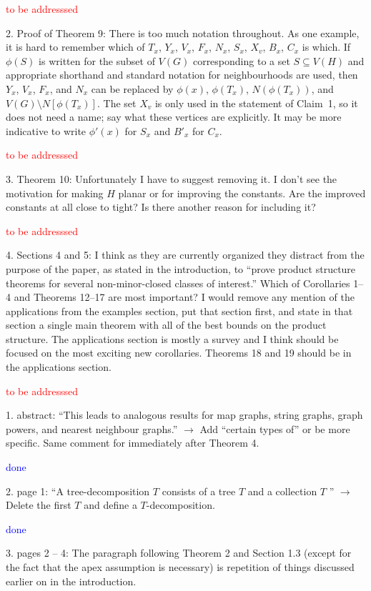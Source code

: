 \documentclass[12pt]{article}
\newcommand{\done}{\textcolor{blue}{done}}
\newcommand{\tba}{\textcolor{red}{to be addresssed}}
\begin{document}
\tba

2. Proof of Theorem 9: There is too much notation throughout. As
one example, it is hard to remember which of $T_x$, $Y_x$, $V_x$, $F_x$, $N_x$,
$S_x$, $X_v$, $B_x$, $C_x$ is which. If $\phi(S)$ is written for the subset of $V(G)$
corresponding to a set $S \subseteq V(H)$ and appropriate shorthand and
standard notation for neighbourhoods are used, then $Y_x$, $V_x$, $F_x$, and
$N_x$ can be replaced by $\phi(x)$, $\phi(T_x)$, $N(\phi(T_x))$, and $V(G) \setminus N[\phi(T_x)]$.
The set $X_v$ is only used in the statement of Claim~1, so it does not
need a name; say what these vertices are explicitly. It may be more
indicative to write $\phi'(x)$ for $S_x$ and $B'_x$ for $C_x$.

\tba

3. Theorem 10: Unfortunately I have to suggest removing it. I don’t see
the motivation for making $H$ planar or for improving the constants.
Are the improved constants at all close to tight? Is there another
reason for including it?

\tba

4. Sections 4 and 5: I think as they are currently organized they distract from the purpose of the paper, as stated in the introduction, to ``prove product structure theorems for several non-minor-closed classes of interest.'' Which of Corollaries 1--4 and Theorems 12--17 are most important? I would remove any mention of the applications from the examples section, put that section first, and state in that section a single main theorem with all of the best bounds on the product structure. The applications section is mostly a survey and I think should be focused on the most exciting new corollaries. Theorems 18 and 19 should be in the applications section.

\tba

1. abstract: ``This leads to analogous results for map graphs, string graphs, graph powers, and nearest neighbour graphs.'' $\longrightarrow$ 
Add ``certain types of'' or be more specific. Same comment for immediately after Theorem 4.

\done

2. page 1: ``A tree-decomposition $T$ consists of a tree $T$ and a collection
$T$ '' $\longrightarrow$ Delete the first $T$ and define a $T$-decomposition.

\done

3. pages 2 – 4: The paragraph following Theorem 2 and Section 1.3
(except for the fact that the apex assumption is necessary) is repetition
of things discussed earlier on in the introduction.
\end{document}

